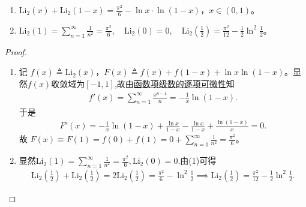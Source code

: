 \documentclass[../../main.tex]{subfiles}%
\begin{document}
\begin{proposition}\label{proposition:Li_2函数的性质}
\begin{enumerate}[(1)]
\item $\mathrm{Li}_2(x) + \mathrm{Li}_2(1-x) = \frac{\pi^2}{6} - \ln x \cdot \ln(1-x)$，$x \in (0,1)$。  

\item $\mathrm{Li}_2\left( 1 \right) =\sum_{n=1}^{\infty}{\frac{1}{n^2}}=\frac{\pi ^2}{6},\quad \mathrm{Li}_2\left( 0 \right) =0,\quad \mathrm{Li}_2\left(\frac{1}{2}\right) = \frac{\pi^2}{12} - \frac{1}{2} \ln^2 \frac{1}{2}$。
\end{enumerate}
\end{proposition}
\begin{proof}
\begin{enumerate}[(1)]
\item 记 $f(x) \triangleq \mathrm{Li}_2(x)$，$F(x) \triangleq f(x) + f(1-x) + \ln x \ln(1-x)$。显然$f(x)$收敛域为$[-1,1]$,故由\hyperref[theorem:函数项级数的逐项可微性]{函数项级数的逐项可微性}知
\begin{align*}
f'(x) = \sum_{n=1}^{\infty} \frac{x^{n-1}}{n} = -\frac{1}{x} \ln(1-x).
\end{align*}  
于是  
\begin{align*}
F'(x) = -\frac{1}{x} \ln(1-x) + \frac{\ln x}{1-x} - \frac{\ln x}{1-x} + \frac{\ln(1-x)}{x} = 0.
\end{align*}  
故 $F(x) \equiv F(1) = f(0) + f(1) = 0 + \sum_{n=1}^{\infty} \frac{1}{n^2} = \frac{\pi^2}{6}$。  

\item 显然$\mathrm{Li}_2\left( 1 \right) =\sum_{n=1}^{\infty}{\frac{1}{n^2}}=\frac{\pi ^2}{6},\mathrm{Li}_2\left( 0 \right) =0.$由(1)可得  
\begin{align*}
\mathrm{Li}_2\left(\frac{1}{2}\right) + \mathrm{Li}_2\left(\frac{1}{2}\right) = 2\mathrm{Li}_2\left(\frac{1}{2}\right) = \frac{\pi^2}{6} - \ln^2 \frac{1}{2} \implies \mathrm{Li}_2\left(\frac{1}{2}\right) = \frac{\pi^2}{12} - \frac{1}{2} \ln^2 \frac{1}{2}.
\end{align*}  
\end{enumerate}

\end{proof}
\end{document}
